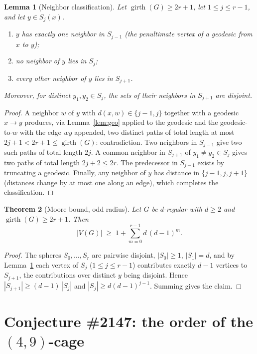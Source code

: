 \documentclass[11pt]{article}
\newtheorem{theorem}{Theorem}
\newtheorem{lemma}[theorem]{Lemma}
\theoremstyle{definition}
\theoremstyle{remark}
\theoremstyle{definition}
\begin{document}
\begin{lemma}[Neighbor classification]\label{lem:class}
Let $\operatorname{girth}(G) \ge 2r+1$, let $1 \le j \le r-1$, and let $y \in S_j(x)$.
\begin{enumerate}
\item $y$ has exactly one neighbor in $S_{j-1}$ (the penultimate vertex of a geodesic from $x$ to $y$);
\item no neighbor of $y$ lies in $S_j$;
\item every other neighbor of $y$ lies in $S_{j+1}$.
\end{enumerate}
Moreover, for distinct $y_1, y_2 \in S_j$, the sets of their neighbors in $S_{j+1}$ are disjoint.
\end{lemma}

\begin{proof}
A neighbor $w$ of $y$ with $d(x,w) \in \{j-1, j\}$ together with a geodesic $x \to y$ produces, via Lemma~\ref{lem:geo} applied to the geodesic and the geodesic-to-$w$ with the edge $wy$ appended, two distinct paths of total length at most $2j+1 < 2r+1 \le \operatorname{girth}(G)$: contradiction. Two neighbors in $S_{j-1}$ give two such paths of total length $2j$. A common neighbor in $S_{j+1}$ of $y_1 \ne y_2 \in S_j$ gives two paths of total length $2j+2 \le 2r$. The predecessor in $S_{j-1}$ exists by truncating a geodesic. Finally, any neighbor of $y$ has distance in $\{j-1, j, j+1\}$ (distances change by at most one along an edge), which completes the classification.
\end{proof}

\begin{theorem}[Moore bound, odd radius]\label{thm:moore}
Let $G$ be $d$-regular with $d \ge 2$ and $\operatorname{girth}(G) \ge 2r + 1$. Then
\[
|V(G)| \;\ge\; 1 + \sum_{m=0}^{r-1} d\,(d-1)^m .
\]
\end{theorem}

\begin{proof}
The spheres $S_0, \dots, S_r$ are pairwise disjoint, $|S_0| \ge 1$, $|S_1| = d$, and by Lemma~\ref{lem:class} each vertex of $S_j$ ($1 \le j \le r-1$) contributes exactly $d - 1$ vertices to $S_{j+1}$, the contributions over distinct $y$ being disjoint. Hence $|S_{j+1}| \ge (d-1)\,|S_j|$ and $|S_j| \ge d (d-1)^{j-1}$. Summing gives the claim.
\end{proof}

\section{Conjecture \#2147: the order of the $(4,9)$-cage}
\end{document}

